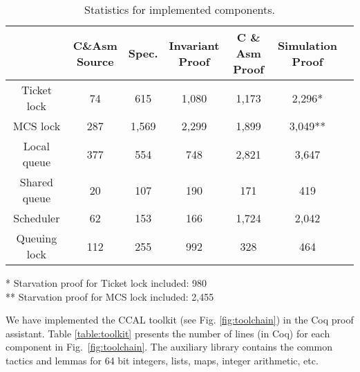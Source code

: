 %
\begin{table}[t]
\caption{Statistics for implemented components.}
\vspace{-5pt}
\begin{center}
\begin{small}
\renewcommand{\arraystretch}{1.1}
\setlength{\tabcolsep}{0.3em}
\begin{tabular}{|c|c|c|c|c|c|c|}
\hline
 & \makecell{ C\&Asm \\Source} & Spec. & \makecell{Invariant \\ Proof} & \makecell{C \& Asm \\Proof} & \makecell{Simulation \\ Proof} \\
\hline
Ticket lock & 74 & 615 & 1,080 & 1,173 & 2,296* \\
\hline
MCS lock & 287 & 1,569 & 2,299  &  1,899 & 3,049** \\
\hline
Local queue & 377 & 554 & 748 & 2,821& 3,647 \\
\hline
Shared queue &  20 & 107 & 190 & 171& 419\\
\hline
Scheduler & 62 & 153 & 166 & 1,724 & 2,042 \\
\hline
Queuing lock & 112 & 255 & 992 & 328 & 464 \\
\hline
\end{tabular}
\end{small}
\end{center}

\begin{flushright}\begin{scriptsize}
* Starvation proof for Ticket lock included: 980\\
** Starvation proof for MCS lock included: 2,455
\end{scriptsize}
\end{flushright}
\label{table:evaluation}

\end{table}


We have implemented the CCAL toolkit (see
Fig. \ref{fig:toolchain}) in the Coq proof assistant. Table
\ref{table:toolkit} presents the number of lines (in Coq) for each component in Fig.~\ref{fig:toolchain}. The auxiliary library contains the common
tactics and lemmas for 64 bit integers, lists, maps, integer
arithmetic, {etc}.




